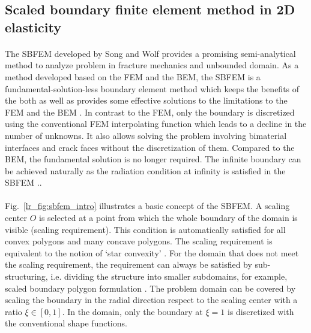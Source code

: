 \subsection{Scaled boundary finite element method in 2D elasticity}
\paragraph{}
The SBFEM developed by Song and Wolf \cite{Wolf1996} provides a promising semi-analytical method to analyze problem in fracture mechanics and unbounded domain.
As a method developed based on the FEM and the BEM, the SBFEM is a fundamental-solution-less boundary element method which keeps the benefits of the both as well as provides some effective solutions to the limitations to the FEM and the BEM \cite{Wol1999}.
In contrast to the FEM, only the boundary is discretized using the conventional FEM interpolating function which leads to a decline in the number of unknowns.
It also allows solving the problem involving bimaterial interfaces and crack faces without the discretization of them.
Compared to the BEM, the fundamental solution is no longer required.
The infinite boundary can be achieved naturally as the radiation condition at infinity is satisfied in the SBFEM \cite{Wol2003}..

\paragraph{}
Fig.~\ref{lr_fig:sbfem_intro} illustrates a basic concept of the SBFEM.
A scaling center $O$ is selected at a point from which the whole boundary of the domain is visible (scaling requirement).
This condition is automatically satisfied for all convex polygons and many concave polygons.
The scaling requirement is equivalent to the notion of `star convexity' \cite{Bishop2014}.
For the domain that does not meet the scaling requirement, the requirement can always be satisfied by sub-structuring, i.e. dividing the structure into smaller subdomains, for example, scaled boundary polygon formulation \cite{NATARAJAN2014101}.
The problem domain can be covered by scaling the boundary in the radial direction respect to the scaling center with a ratio $\xi \in [0,1]$.
In the domain, only the boundary at $\xi=1$ is discretized with the conventional shape functions.

